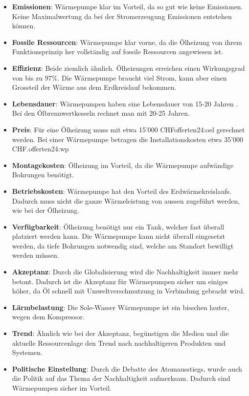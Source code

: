 \begin{itemize}

\item \textbf{Emissionen}: Wärmepumpe klar im Vorteil, da so gut wie keine Emissionen. Keine Maximalwertung da bei der Stromerzeugung Emissionen entstehen können.

\item \textbf{Fossile Ressourcen}: Wärmepumpe klar vorne, da die Ölheizung von ihrem Funktionsprinzip her vollständig auf fossile Ressourcen angewiesen ist.

\item \textbf{Effizienz}: Beide ziemlich ähnlich. Ölheizungen erreichen einen Wirkungsgrad von bis zu 97\%. Die Wärmepumpe braucht viel Strom, kann aber einen Grossteil der Wärme aus dem Erdkreislauf bekommen.

\item \textbf{Lebensdauer}: Wärmepumpen haben eine Lebensdauer von 15-20 Jahren \cite{fws:faq}. Bei den Ölbrennwertkesseln rechnet man mit 20-25 Jahren\cite{offerten24:oel}.

\item \textbf{Preis}: Für eine Ölheizung muss mit etwa 15'000 CHF{offerten24:oel} gerechnet werden. Bei einer Wärmepumpe betragen die Installationskosten etwa 35'000 CHF.{offerten24:wp}

\item \textbf{Montagekosten}: Ölheizung im Vorteil, da die Wärmepumpe aufwändige Bohrungen benötigt.

\item \textbf{Betriebskosten}: Wärmepumpe hat den Vorteil des Erdwärmekreislaufs. Dadurch muss nicht die ganze Wärmeleistung von aussen zugeführt werden, wie bei der Ölheizung.

\item \textbf{Verfügbarkeit}: Ölheizung benötigt nur ein Tank, welcher fast überall platziert werden kann. Die Wärmepumpe kann nicht überall eingesetzt werden, da tiefe Bohrungen notwendig sind, welche am Standort bewilligt werden müssen. 

\item \textbf{Akzeptanz}: Durch die Globalisierung wird die Nachhaltigkeit immer mehr betont. Dadurch ist die Akzeptanz für Wärmepumpen sicher um einiges höher, da Öl schnell mit Umweltverschmutzung in Verbindung gebracht wird.

\item \textbf{Lärmbelastung}: Die Sole-Wasser Wärmepumpe ist ein bisschen lauter, wegen dem Kompressor. 

\item \textbf{Trend}: Ähnlich wie bei der Akzeptanz, begünstigen die Medien und die aktuelle Ressourcenlage den Trend nach nachhaltigeren Produkten und Systemen.

\item \textbf{Politische Einstellung}: Durch die Debatte des Atomausstiegs, wurde auch die Politik auf das Thema der Nachhaltigkeit aufmerksam. Dadurch sind Wärmepumpen sicher im Vorteil.

\end{itemize}
